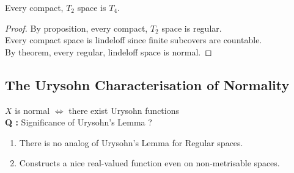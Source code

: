 \begin{corollary}
	Every compact, $T_2$ space is $T_4$.
\end{corollary}
\begin{proof}
	By proposition, every compact, $T_2$ space is regular.\\
	Every compact space is lindeloff since finite subcovers are countable.\\
	By theorem, every regular, lindeloff space is normal.
\end{proof}


\subsection{The Urysohn Characterisation of Normality}
\begin{important}
	$X$ is normal $\iff$ there exist Urysohn functions\\
	\textbf{Q :} Significance of Urysohn's Lemma ?
\end{important}
	\begin{enumerate}
		\item There is no analog of Urysohn's Lemma for Regular spaces.
		\item Constructs a nice real-valued function even on non-metrisable spaces.
	\end{enumerate}

